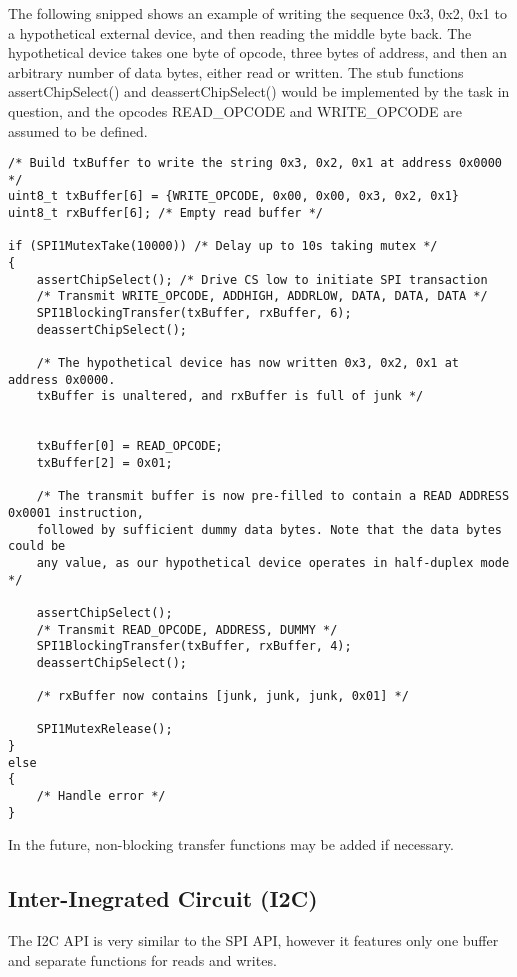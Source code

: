 \documentclass{article}
\begin{document}
The following snipped shows an example of writing the sequence 0x3, 0x2, 0x1 to
a hypothetical external device, and then reading the middle byte back.
The hypothetical device takes one byte of opcode, three bytes of address, and then
an arbitrary number of data bytes, either read or written.
The stub functions
assertChipSelect() and deassertChipSelect() would be implemented by the task in question,
and the opcodes READ_OPCODE and WRITE_OPCODE are assumed to be defined.

\begin{verbatim}
/* Build txBuffer to write the string 0x3, 0x2, 0x1 at address 0x0000 */
uint8_t txBuffer[6] = {WRITE_OPCODE, 0x00, 0x00, 0x3, 0x2, 0x1}
uint8_t rxBuffer[6]; /* Empty read buffer */

if (SPI1MutexTake(10000)) /* Delay up to 10s taking mutex */
{  
    assertChipSelect(); /* Drive CS low to initiate SPI transaction
    /* Transmit WRITE_OPCODE, ADDHIGH, ADDRLOW, DATA, DATA, DATA */
    SPI1BlockingTransfer(txBuffer, rxBuffer, 6);
    deassertChipSelect();
    
    /* The hypothetical device has now written 0x3, 0x2, 0x1 at address 0x0000.
    txBuffer is unaltered, and rxBuffer is full of junk */
    
    
    txBuffer[0] = READ_OPCODE;
    txBuffer[2] = 0x01;
    
    /* The transmit buffer is now pre-filled to contain a READ ADDRESS 0x0001 instruction,
    followed by sufficient dummy data bytes. Note that the data bytes could be
    any value, as our hypothetical device operates in half-duplex mode */
    
    assertChipSelect();
    /* Transmit READ_OPCODE, ADDRESS, DUMMY */
    SPI1BlockingTransfer(txBuffer, rxBuffer, 4);
    deassertChipSelect();
    
    /* rxBuffer now contains [junk, junk, junk, 0x01] */
    
    SPI1MutexRelease();
}
else
{
    /* Handle error */
}

\end{verbatim}

In the future, non-blocking transfer functions may be added if necessary.

\subsection{Inter-Inegrated Circuit (I2C)}
The I2C API is very similar to the SPI API, however it features only one buffer
and separate functions for reads and writes.
\end{document}

